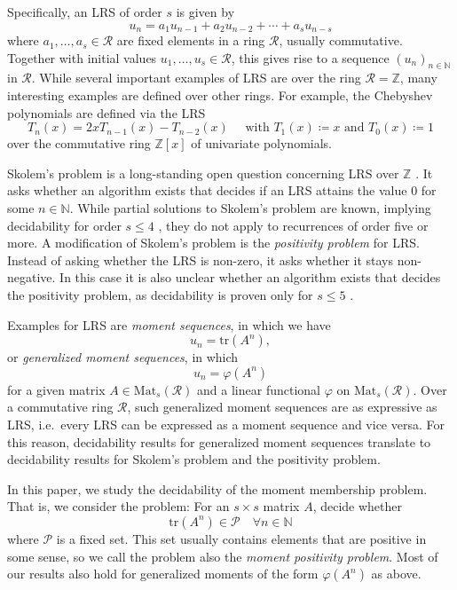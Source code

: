\documentclass[11pt]{article}
\theoremstyle{definition}
\newcommand{\tr}{\mathrm{tr}}
\begin{document}
Specifically, an LRS of order $s$ is given by
$$
u_n = a_1 u_{n-1} + a_2 u_{n-2} + \cdots + a_s u_{n-s}
$$
where $a_1, \ldots, a_s \in \mathcal{R}$ are fixed elements in a ring $\mathcal{R}$, usually commutative. Together with initial values $u_1, \ldots, u_s \in \mathcal{R}$, this gives rise to a sequence $(u_n)_{n \in \mathbb{N}}$ in $\mathcal{R}$. While several important examples of LRS are over the ring $\mathcal{R} = \mathbb{Z}$, many interesting examples are defined over other rings. For example, the Chebyshev polynomials are defined via the LRS
$$ T_{n}(x) = 2x T_{n-1}(x) - T_{n-2}(x) \quad \text{ with } T_1(x) \coloneqq x \text{ and } T_0(x) \coloneqq 1$$
over the commutative ring  $\mathbb{Z}[x]$ of univariate polynomials.

Skolem's problem is a long-standing open question concerning LRS over $\mathbb{Z}$ \cite{Ou12}. It asks whether an algorithm exists that decides if an LRS attains the value $0$ for some $n \in \mathbb{N}$.
While partial solutions to Skolem's problem are known, implying decidability for order $s \leqslant 4$ \cite{Ti84, Ve85}, they do not apply to recurrences of order five or more.
A modification of Skolem's problem is the \emph{positivity problem} for LRS. Instead of asking whether the LRS is non-zero, it asks whether it stays non-negative.
In this case it is also unclear whether an algorithm exists that decides the positivity problem, as decidability is proven only for $s \leqslant 5$ \cite{OW, OW2}.

Examples for LRS are \emph{moment sequences}, in which we have 
$$ 
u_n = \tr(A^n),
$$
or \emph{generalized moment sequences}, in which $$u_n=\varphi(A^n)$$ 
for a given matrix $A \in \mathrm{Mat}_s(\mathcal{R})$ and a linear functional  $\varphi$ on $\mathrm{Mat}_s(\mathcal R)$.
Over a commutative ring $\mathcal R$, such generalized moment sequences are as expressive as LRS, i.e.\ every LRS can be expressed as a moment sequence and vice versa. For this reason, decidability results for generalized  moment sequences translate to decidability results for Skolem's problem and the positivity problem. 

In this paper, we study the decidability of the moment membership problem. 
That is, we consider the problem: For an $s \times s$ matrix $A$, decide whether 
$$ 
 \tr(A^n) \in \mathcal{P} \quad  \forall n\in \mathbb{N}
$$
where $\mathcal{P}$ is a fixed set. This set usually contains elements that are positive in some sense, so we call the problem also the \emph{moment positivity problem}. Most of our results also hold for generalized moments of the form $\varphi(A^n)$ as above.
\end{document}
